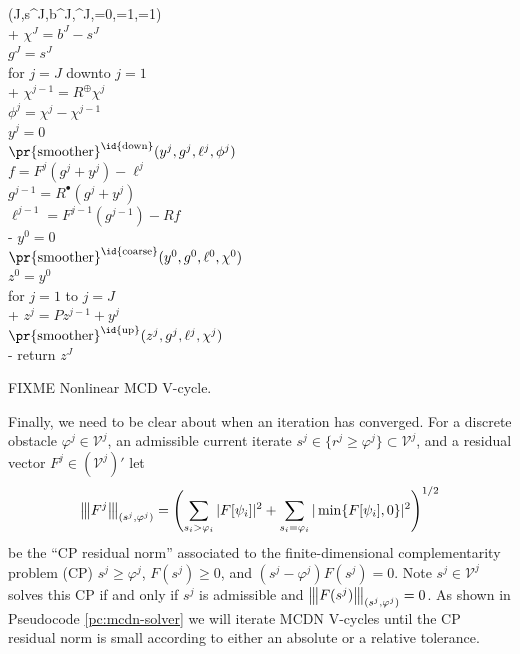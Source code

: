 \documentclass[letterpaper,final,12pt,reqno]{amsart}
\theoremstyle{claim}
\newcommand{\mR}{R^{\bm{\oplus}}}
\newcommand{\iR}{R^{\bullet}}
\newcommand{\vertiii}[1]{{\left\vert\kern-0.25ex\left\vert\kern-0.25ex\left\vert #1 \right\vert\kern-0.25ex\right\vert\kern-0.25ex\right\vert}}
\numberwithin{equation}{section}
\numberwithin{figure}{section}
\numberwithin{table}{section}
\numberwithin{theorem}{section}
\begin{document}
\begin{pcode}[ht]
\begin{pseudo*}
(J,s^J,b^J,\ell^J,=0,=1,=1)\text{:} \\+
    $\chi^J = b^J - s^J$ \\
    $g^J = s^J$ \\
    for $j=J$ downto $j=1$ \\+
      $\chi^{j-1} = \mR \chi^j$ \\
      $\phi^j = \chi^j - \chi^{j-1}$ \\
      $y^j = 0$ \\
      $\text{\pr{smoother}}^{\text{\id{down}}}(y^j,g^j,\ell^j,\phi^j)$ \qquad {} \\
      $f = F^j(g^j+y^j) - \ell^j$ \\
      $g^{j-1} = \iR(g^j + y^j)$ \\
      $\ell^{j-1} = F^{j-1}(g^{j-1}) - R f$ \\-
    $y^0 = 0$ \\
    $\text{\pr{smoother}}^{\text{\id{coarse}}}(y^0,g^0,\ell^0,\chi^0)$ \qquad {} \\
    $z^0 = y^0$ \\
    for $j=1$ to $j=J$ \\+
      $z^j = P z^{j-1} + y^{j}$ \\
      $\text{\pr{smoother}}^{\text{\id{up}}}(z^j,g^j,\ell^j,\chi^j)$ \qquad {} \\-
    return $z^J$
\end{pseudo*}
\caption{FIXME Nonlinear MCD V-cycle.}
\label{pc:mcdn-vcycle}
\end{pcode}

Finally, we need to be clear about when an iteration has converged.  For a discrete obstacle $\varphi^j \in \mathcal{V}^j$, an admissible current iterate $s^j\in \{r^j \ge \varphi^j\} \subset \mathcal{V}^j$, and a residual vector $F^j \in (\mathcal{V}^j)'$ let
\begin{equation}
\vertiii{F^j}_{(s^j,\varphi^j)} = \left(\sum_{s_i > \varphi_i} |F[\psi_i]|^2 + \sum_{s_i = \varphi_i} |\min\{F[\psi_i],0\}|^2\right)^{1/2} \label{eq:cpnorm}
\end{equation}
be the ``CP residual norm'' associated to the finite-dimensional complementarity problem (CP) $s^j \ge \varphi^j$, $F(s^j) \ge 0$, and $(s^j-\varphi^j) F(s^j) = 0$.  Note $s^j \in \mathcal{V}^j$ solves this CP if and only if $s^j$ is admissible and $\vertiii{F(s^j)}_{(s^j,\varphi^j)}=0$.  As shown in Pseudocode \ref{pc:mcdn-solver} we will iterate MCDN V-cycles until the CP residual norm is small according to either an absolute or a relative tolerance.
\end{document}

